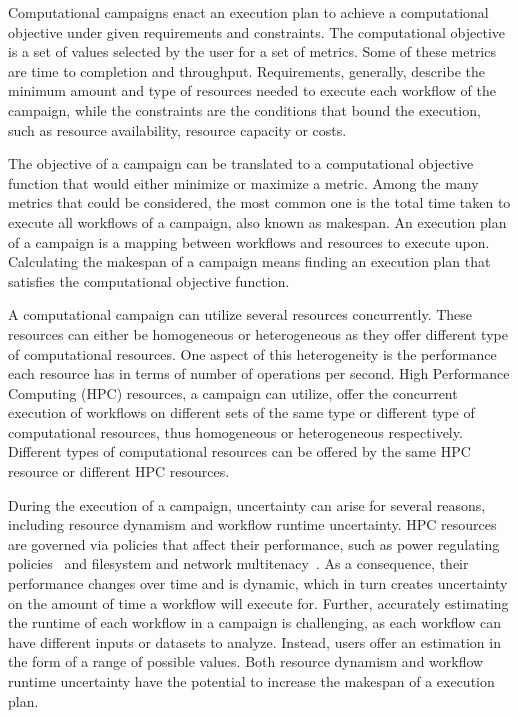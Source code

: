 \label{ch:campaigns}
Computational campaigns enact an execution plan to achieve a computational objective under given requirements and constraints.
The computational objective is a set of values selected by the user for a set of metrics.
Some of these metrics are time to completion and throughput.
Requirements, generally, describe the minimum amount and type of resources needed to execute each workflow of the campaign, while the constraints are the conditions that bound the execution, such as resource availability, resource capacity or costs.

The objective of a campaign can be translated to a computational objective function that would either minimize or maximize a metric.
Among the many metrics that could be considered, the most common one is the total time taken to execute all workflows of a campaign, also known as makespan.
An execution plan of a campaign is a mapping between workflows and resources to execute upon.
Calculating the makespan of a campaign means finding an execution plan that satisfies the computational objective function.

A computational campaign can utilize several resources concurrently.
These resources can either be homogeneous or heterogeneous as they offer different type of computational resources.
One aspect of this heterogeneity is the performance each resource has in terms of number of operations per second.
High Performance Computing (HPC) resources, a campaign can utilize, offer the concurrent execution of workflows on different sets of the same type or different type of computational resources, thus homogeneous or heterogeneous respectively.
Different types of computational resources can be offered by the same HPC resource or different HPC resources.

During the execution of a campaign, uncertainty can arise for several reasons, including resource dynamism and workflow runtime uncertainty.
HPC resources are governed via policies that affect their performance, such as power regulating policies~\cite{inadomi2015analyzing} and filesystem and network  multitenacy~\cite{brown2018interference}.
As a consequence, their performance changes over time and is dynamic, which in turn creates uncertainty on the amount of time a workflow will execute for.
Further, accurately estimating the runtime of each workflow in a campaign is challenging, as each workflow can have different inputs or datasets to analyze.
Instead, users offer an estimation in the form of a range of possible values.
Both resource dynamism and workflow runtime uncertainty have the potential to increase the makespan of a execution plan.

